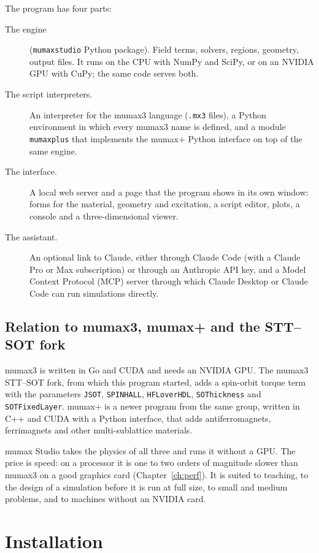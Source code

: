 \documentclass[11pt,a4paper,oneside]{book}
\newcommand{\code}[1]{\texttt{#1}}
\renewcommand{\_}{\textunderscore\allowbreak}
\begin{document}
The program has four parts:
\begin{description}
\item[The engine] (\code{mumaxstudio} Python package). Field terms, solvers, regions, geometry, output files.
It runs on the CPU with NumPy and SciPy, or on an NVIDIA GPU with CuPy; the same code serves both.
\item[The script interpreters.] An interpreter for the mumax3 language (\code{.mx3} files), a Python
environment in which every mumax3 name is defined, and a module \code{mumaxplus} that implements the mumax+
Python interface on top of the same engine.
\item[The interface.] A local web server and a page that the program shows in its own window: forms for the
material, geometry and excitation, a script editor, plots, a console and a three-dimensional viewer.
\item[The assistant.] An optional link to Claude, either through Claude Code (with a Claude Pro or Max
subscription) or through an Anthropic API key, and a Model Context Protocol (MCP) server through which Claude
Desktop or Claude Code can run simulations directly.
\end{description}

\section{Relation to mumax3, mumax+ and the STT--SOT fork}

mumax3 is written in Go and CUDA and needs an NVIDIA GPU. The mumax3 STT--SOT fork, from which this program
started, adds a spin-orbit torque term with the parameters \code{JSOT}, \code{SPINHALL}, \code{HFLoverHDL},
\code{SOThickness} and \code{SOTFixedLayer}. mumax+ is a newer program from the same group, written in C++
and CUDA with a Python interface, that adds antiferromagnets, ferrimagnets and other multi-sublattice materials.

mumax Studio takes the physics of all three and runs it without a GPU. The price is speed: on a processor it is
one to two orders of magnitude slower than mumax3 on a good graphics card (Chapter~\ref{ch:perf}). It is
suited to teaching, to the design of a simulation before it is run at full size, to small and medium problems,
and to machines without an NVIDIA card.

\chapter{Installation}\label{ch:install}
\end{document}
